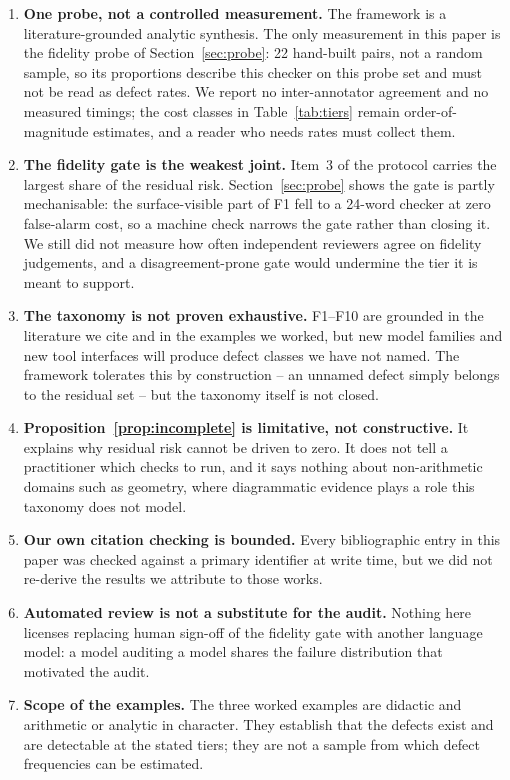 \documentclass[11pt]{article}
\theoremstyle{plain}
\theoremstyle{definition}
\begin{document}
\begin{enumerate}[leftmargin=*,itemsep=2pt]
\item \textbf{One probe, not a controlled measurement.} The framework is a literature-grounded
analytic synthesis. The only measurement in this paper is the fidelity probe of
Section~\ref{sec:probe}: 22 hand-built pairs, not a random sample, so its proportions describe
this checker on this probe set and must not be read as defect rates. We report no inter-annotator
agreement and no measured timings; the cost classes in Table~\ref{tab:tiers} remain
order-of-magnitude estimates, and a reader who needs rates must collect them.
\item \textbf{The fidelity gate is the weakest joint.} Item~3 of the protocol carries the largest
share of the residual risk. Section~\ref{sec:probe} shows the gate is partly mechanisable: the
surface-visible part of F1 fell to a 24-word checker at zero false-alarm cost, so a machine check
narrows the gate rather than closing it. We still did not measure how often independent reviewers
agree on fidelity judgements, and a disagreement-prone gate would undermine the tier it is meant
to support.
\item \textbf{The taxonomy is not proven exhaustive.} F1--F10 are grounded in the literature we
cite and in the examples we worked, but new model families and new tool interfaces will produce
defect classes we have not named. The framework tolerates this by construction -- an unnamed defect
simply belongs to the residual set -- but the taxonomy itself is not closed.
\item \textbf{Proposition~\ref{prop:incomplete} is limitative, not constructive.} It explains why
residual risk cannot be driven to zero. It does not tell a practitioner which checks to run, and it
says nothing about non-arithmetic domains such as geometry, where diagrammatic evidence plays a
role this taxonomy does not model.
\item \textbf{Our own citation checking is bounded.} Every bibliographic entry in this paper was
checked against a primary identifier at write time, but we did not re-derive the results we
attribute to those works.
\item \textbf{Automated review is not a substitute for the audit.} Nothing here licenses replacing
human sign-off of the fidelity gate with another language model: a model auditing a model shares
the failure distribution that motivated the audit.
\item \textbf{Scope of the examples.} The three worked examples are didactic and arithmetic or
analytic in character. They establish that the defects exist and are detectable at the stated
tiers; they are not a sample from which defect frequencies can be estimated.
\end{enumerate}
\end{document}
